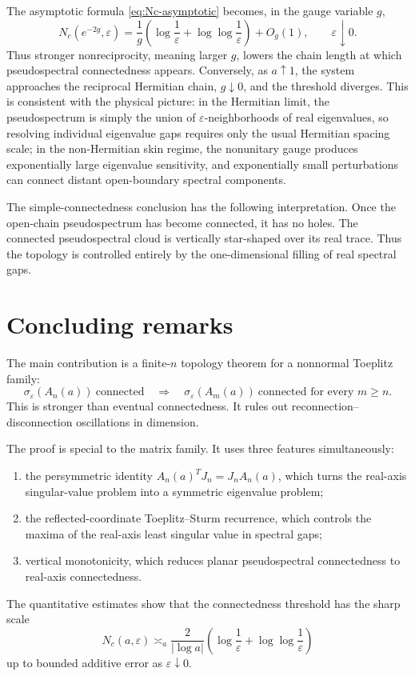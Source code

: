 \documentclass[11pt]{amsart}
\numberwithin{equation}{section}
\newcommand{\eps}{\varepsilon}
\newcommand{\A}{A}
\newcommand{\J}{J}
\begin{document}
The asymptotic formula \eqref{eq:Nc-asymptotic} becomes, in the gauge variable \(g\),
\[
N_c(e^{-2g},\eps)
=
\frac1g
\left(
\log\frac1\eps+\log\log\frac1\eps
\right)
+O_g(1),
\qquad \eps\downarrow0.
\]
Thus stronger nonreciprocity, meaning larger \(g\), lowers the chain length at which pseudospectral connectedness appears.  Conversely, as \(a\uparrow1\), the system approaches the reciprocal Hermitian chain, \(g\downarrow0\), and the threshold diverges.  This is consistent with the physical picture: in the Hermitian limit, the pseudospectrum is simply the union of \(\eps\)-neighborhoods of real eigenvalues, so resolving individual eigenvalue gaps requires only the usual Hermitian spacing scale; in the non-Hermitian skin regime, the nonunitary gauge produces exponentially large eigenvalue sensitivity, and exponentially small perturbations can connect distant open-boundary spectral components.

The simple-connectedness conclusion has the following interpretation.  Once the open-chain pseudospectrum has become connected, it has no holes.  The connected pseudospectral cloud is vertically star-shaped over its real trace.  Thus the topology is controlled entirely by the one-dimensional filling of real spectral gaps.

\section{Concluding remarks}

The main contribution is a finite-\(n\) topology theorem for a nonnormal Toeplitz family:
\[
\sigma_\eps(\A_n(a))\ \text{connected}
\quad\Longrightarrow\quad
\sigma_\eps(\A_m(a))\ \text{connected for every }m\ge n.
\]
This is stronger than eventual connectedness.  It rules out reconnection--disconnection oscillations in dimension.

The proof is special to the matrix family.  It uses three features simultaneously:
\begin{enumerate}
\item the persymmetric identity \(\A_n(a)^T\J_n=\J_n\A_n(a)\), which turns the real-axis singular-value problem into a symmetric eigenvalue problem;
\item the reflected-coordinate Toeplitz--Sturm recurrence, which controls the maxima of the real-axis least singular value in spectral gaps;
\item vertical monotonicity, which reduces planar pseudospectral connectedness to real-axis connectedness.
\end{enumerate}
The quantitative estimates show that the connectedness threshold has the sharp scale
\[
N_c(a,\eps)
\asymp_a
\frac{2}{|\log a|}
\left(
\log\frac1\eps+\log\log\frac1\eps
\right)
\]
up to bounded additive error as \(\eps\downarrow0\).
\end{document}
